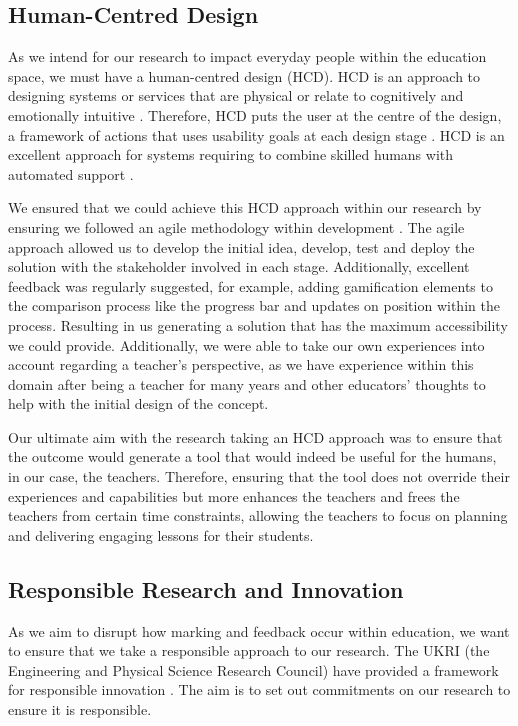 	\subsection{Human-Centred Design}
	As we intend for our research to impact everyday people within the education space, we must have a human-centred design (HCD). HCD is an approach to designing systems or services that are physical or relate to cognitively and emotionally intuitive \cite{giacomin2014human}. Therefore, HCD puts the user at the centre of the design, a framework of actions that uses usability goals at each design stage \cite{w3_ucd}. HCD is an excellent approach for systems requiring to combine skilled humans with automated support \cite{kesseler2006towards}.
	
	We ensured that we could achieve this HCD approach within our research by ensuring we followed an agile methodology within development \cite{kumar2012impact}. The agile approach allowed us to develop the initial idea, develop, test and deploy the solution with the stakeholder involved in each stage. Additionally, excellent feedback was regularly suggested, for example, adding gamification elements to the comparison process like the progress bar and updates on position within the process. Resulting in us generating a solution that has the maximum accessibility we could provide. Additionally, we were able to take our own experiences into account regarding a teacher's perspective, as we have experience within this domain after being a teacher for many years and other educators' thoughts to help with the initial design of the concept.
	
	Our ultimate aim with the research taking an HCD approach was to ensure that the outcome would generate a tool that would indeed be useful for the humans, in our case, the teachers. Therefore, ensuring that the tool does not override their experiences and capabilities but more enhances the teachers and frees the teachers from certain time constraints, allowing the teachers to focus on planning and delivering engaging lessons for their students.
	
	\subsection{Responsible Research and Innovation}
	As we aim to disrupt how marking and feedback occur within education, we want to ensure that we take a responsible approach to our research. The UKRI (the Engineering and Physical Science Research Council) have provided a framework for responsible innovation \cite{ukri}. The aim is to set out commitments on our research to ensure it is responsible.
	
